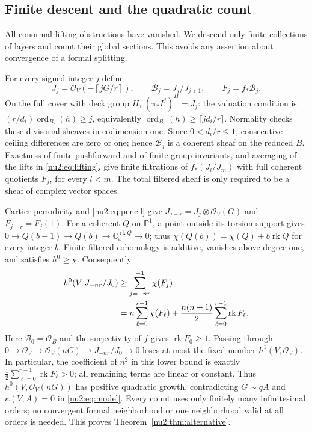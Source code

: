 \subsection{Finite descent and the quadratic count}\label{nu2:subsec:count}

All conormal lifting obstructions have vanished.  We descend only finite collections of layers and count their global sections.  This avoids any assertion about convergence of a formal splitting.

For every signed integer $j$ define
\[
 J_j=\mathcal O_V\left(-\left\lceil jG/r\right\rceil\right),
 \qquad\mathcal B_j=J_j/J_{j+1},\qquad F_j=f_*\mathcal B_j.
\]
On the full cover with deck group $H$,
$(\pi_*I^j)^H=J_j$: the valuation condition is
$(r/d_i)\operatorname{ord}_{B_i}(h)\ge j$, equivalently
$\operatorname{ord}_{B_i}(h)\ge\lceil jd_i/r\rceil$.
Normality checks these divisorial sheaves in codimension one.
Since $0<d_i/r\le1$, consecutive ceiling differences are zero or
one; hence $\mathcal B_j$ is a coherent sheaf on the reduced $B$.
Exactness of finite pushforward and of finite-group invariants,
and averaging of the lifts in \eqref{nu2:eq:lifting}, give finite
filtrations of $f_*(J_l/J_m)$ with full coherent quotients $F_j$,
for every $l<m$.  The total filtered sheaf is only required to be
a sheaf of complex vector spaces.

Cartier periodicity and \eqref{nu2:eq:pencil} give
$J_{j-r}=J_j\otimes\mathcal O_V(G)$ and $F_{j-r}=F_j(1)$.
For a coherent $Q$ on $\mathbb P^1$, a point outside its torsion
support gives
$0\to Q(b-1)\to Q(b)\to\mathbb C_x^{\operatorname{rk}Q}\to0$;
thus $\chi(Q(b))=\chi(Q)+b\operatorname{rk}Q$ for every integer $b$.
Finite-filtered cohomology is additive, vanishes above degree one,
and satisfies $h^0\ge\chi$.  Consequently
\begin{align}\label{nu2:eq:quadratic-count}
 h^0(V,J_{-nr}/J_0)
 &\ge\sum_{j=-nr}^{-1}\chi(F_j)\notag\\
 &=n\sum_{\ell=0}^{r-1}\chi(F_\ell)
   +\frac{n(n+1)}2\sum_{\ell=0}^{r-1}\operatorname{rk}F_\ell.
\end{align}
Here $\mathcal B_0=\mathcal O_B$ and the surjectivity of $f$ gives
$\operatorname{rk}F_0\ge1$.  Passing through
$0\to\mathcal O_V\to\mathcal O_V(nG)\to J_{-nr}/J_0\to0$
loses at most the fixed number $h^1(V,\mathcal O_V)$.
In particular, the coefficient of $n^2$ in this lower bound is exactly
$\tfrac12\sum_{\ell=0}^{r-1}\operatorname{rk}F_\ell>0$; all remaining
terms are linear or constant.  Thus $h^0(V,\mathcal O_V(nG))$ has positive quadratic growth,
contradicting $G\sim qA$ and $\kappa(V,A)=0$ in
\eqref{nu2:eq:model}.  Every count uses only finitely many
infinitesimal orders; no convergent formal neighborhood or one
neighborhood valid at all orders is needed.  This proves
Theorem~\ref{nu2:thm:alternative}.

